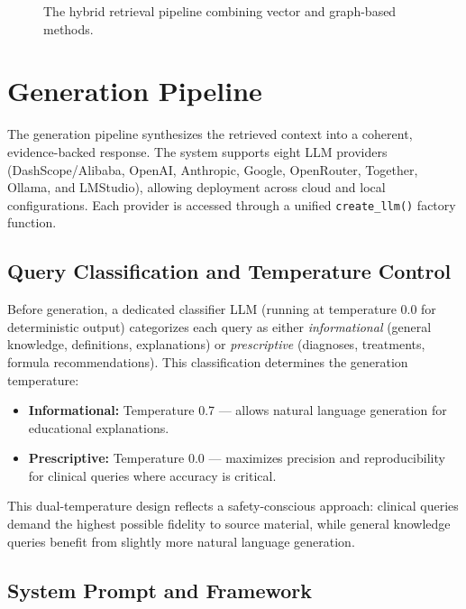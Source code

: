 \begin{figure}[H]
    \centering
    \caption{The hybrid retrieval pipeline combining vector and graph-based methods.}
    \label{fig:retrieval_flow}
\end{figure}

\section{Generation Pipeline}

The generation pipeline synthesizes the retrieved context into a coherent, evidence-backed response. The system supports eight LLM providers (DashScope/Alibaba, OpenAI, Anthropic, Google, OpenRouter, Together, Ollama, and LMStudio), allowing deployment across cloud and local configurations. Each provider is accessed through a unified \texttt{create\_llm()} factory function.

\subsection{Query Classification and Temperature Control}

Before generation, a dedicated classifier LLM (running at temperature 0.0 for deterministic output) categorizes each query as either \textit{informational} (general knowledge, definitions, explanations) or \textit{prescriptive} (diagnoses, treatments, formula recommendations). This classification determines the generation temperature:

\begin{itemize}
    \item \textbf{Informational:} Temperature 0.7 --- allows natural language generation for educational explanations.
    \item \textbf{Prescriptive:} Temperature 0.0 --- maximizes precision and reproducibility for clinical queries where accuracy is critical.
\end{itemize}

This dual-temperature design reflects a safety-conscious approach: clinical queries demand the highest possible fidelity to source material, while general knowledge queries benefit from slightly more natural language generation.

\subsection{System Prompt and Framework}

